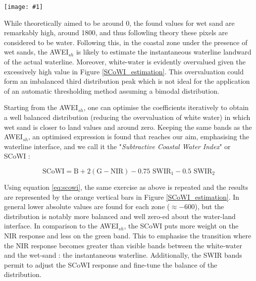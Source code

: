 \documentclass[remotesensing,technicalnote,submit,pdftex,moreauthors]{Definitions/mdpi}
\newcommand{\myfigure}[4]{
    \begin{figure*}[ht!]
        \centering
        \texttt{[image: \#1]}	 
        \caption{\itshape#2}
        \label{#3}
    \end{figure*} 
}
\begin{document}
\myfigure{img/SCoWI_optimisation.png}{Comparison of the estimated SCoWI values (orange bars) against the AWEI$_{sh}$ (blue bars) over the 5 areas of the intertidal zone. The SCoWI has lower estimated values than AWEI$_{sh}$ on the white-water and wet sand area, optimising the land/water classification on sandy beaches by setting its boundary on the waterline.}{SCoWI_estimation}{0.5}

While theoretically aimed to be around 0, the found values for wet sand are remarkably high, around 1800, and thus followling theory these pixels are considered to be water. Following this, in the coastal zone under the presence of wet sands, the AWEI$_{sh}$ is likely to estimate the instantaneous waterline landward of the actual waterline. Moreover, white-water is evidently overvalued given the excessively high value in Figure \ref{SCoWI_estimation}. This overvaluation could form an imbalanced third distribution peak which is not ideal for the application of an automatic thresholding method assuming a bimodal distribution.

Starting from the AWEI$_{sh}$, one can optimise the coefficients iteratively to obtain a well balanced distribution (reducing the overvaluation of white water) in which wet sand is closer to land values and around zero. Keeping the same bands as the AWEI$_{sh}$, an optimised expression is found that reaches our aim, emphasising the waterline interface, and we call it the "\textit{Subtractive Coastal Water Index}" or SCoWI : 

\begin{equation}
    \textrm{SCoWI} = \textrm{B} + 2(\textrm{G} - \textrm{NIR}) - 0.75 \textrm{ SWIR$_{1}$} - 0.5 \textrm{ SWIR$_{2}$}
    \label{eq:scowi}
\end{equation}

Using equation \ref{eq:scowi}, the same exercise as above is repeated and the results are represented by the orange vertical bars in Figure \ref{SCoWI_estimation}. In general lower absolute values are found for each zone ($\approx -600$), but the distribution is notably more balanced and well zero-ed about the water-land interface. In comparison to the AWEI$_{sh}$, the SCoWI puts more weight on the NIR response and less on the green band. This to emphasise the transition where the NIR response becomes greater than visible bands between the white-water and the wet-sand : the instantaneous waterline. Additionally, the SWIR bands permit to adjust the SCoWI response and fine-tune the balance of the distribution.
        
\end{document}
